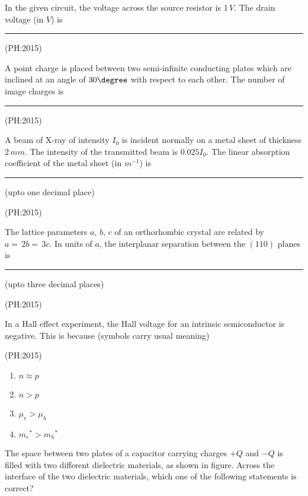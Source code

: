 \iffalse
\title{PH:2015}
\author{AI24BTECH11007}
\section{ph}
\chapter{2015}
\fi
                          
	\item
		In the given circuit, the voltage across the source resistor is $1 \, V$. The drain voltage (in $V$) is \rule{2cm}{0.4pt}

		\hfill{(PH:2015)}
		\begin{center}
			
		\end{center}
		\vspace{0.5cm}
	\item
		A point charge is placed between two semi-infinite conducting plates which are inclined at an angle of $30\degree$ with respect to each other. The number of image charges is  \rule{2.5cm}{0.4pt}

		\hfill{(PH:2015)}
		\vspace{0.5cm}
	\item 
		A beam of X-ray of intensity $I_0$ is incident normally on a metal sheet of thickness $2 \, mm$. The intensity of the transmitted beam is $0.025I_0$. The linear absorption coefficient of the metal sheet (in $m^{-1}$) is \rule{2.5cm}{0.4pt} (upto one decimal place)

		\hfill{(PH:2015)}
		\vspace{0.5cm}
		\item
			The lattice parameters $a$, $b$, $c$ of an orthorhombic crystal are related by $a=\, 2b= \, 3c$. In units of $a$, the interplanar separation between the $(110)$ planes is \rule{2cm}{0.4pt} (upto three decimal places)

			\hfill{(PH:2015)}
			\vspace{0.5cm}
		\item
			In a Hall effect experiment, the Hall voltage for an intrinsic semiconductor is negative. This is because (symbols carry usual meaning)

			\hfill{(PH:2015)}
		\begin{multicols}{4}
			\begin{enumerate}
				\item $n\approx p$
				\item $n > p$
				\item $\mu_e > \mu_h$
				\item ${m_e}^* > {m_h}^*$
			\end{enumerate}
		\end{multicols}
	\item
		The space between two plates of a capacitor carrying charges $+Q$ and $-Q$ is filled with two different dielectric materials, as shown in figure. Across the interface of the two dielectric materials, which one of the following statements is correct?
		\begin{center}
			
		\end{center}

